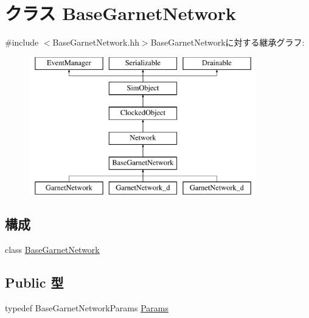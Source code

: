 \hypertarget{classBaseGarnetNetwork}{
\section{クラス BaseGarnetNetwork}
\label{classBaseGarnetNetwork}
}


{\ttfamily \#include $<$BaseGarnetNetwork.hh$>$}BaseGarnetNetworkに対する継承グラフ:\begin{figure}[H]
\begin{center}
\leavevmode
\includegraphics[height=6cm]{classBaseGarnetNetwork}
\end{center}
\end{figure}
\subsection*{構成}
\begin{DoxyCompactItemize}
\item 
class \hyperlink{classBaseGarnetNetwork_1_1BaseGarnetNetwork}{BaseGarnetNetwork}
\end{DoxyCompactItemize}
\subsection*{Public 型}
\begin{DoxyCompactItemize}
\item 
typedef BaseGarnetNetworkParams \hyperlink{classBaseGarnetNetwork_a9b387eae2084a167c00ec5550159a245}{Params}
\end{DoxyCompactItemize}
